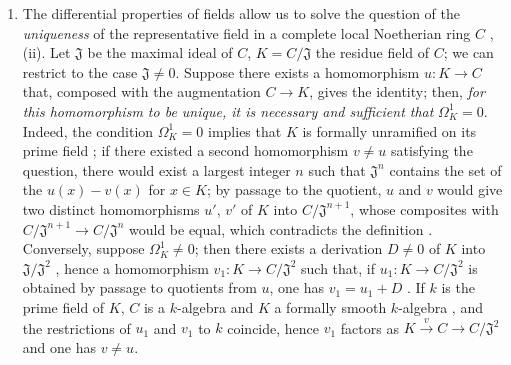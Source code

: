 \begin{remarks}[21.5.3]
\label{0.21.5.3}
\begin{enumerate}
  \item[(i)] The differential properties of fields allow us to solve the question of the \emph{uniqueness} of the representative field in a complete local Noetherian ring $C$ , (ii).
    Let $\mathfrak{J}$ be the maximal ideal of $C$, $K=C/\mathfrak{J}$ the residue field of $C$; we can restrict to the case $\mathfrak{J}\neq 0$.
    Suppose there exists a homomorphism $u:K\to C$ that, composed with the augmentation $C\to K$, gives the identity; then, \emph{for this homomorphism to be unique, it is necessary and sufficient that} $\Omega^1_K=0$.
    Indeed, the condition $\Omega^1_K=0$ implies that $K$ is formally unramified on its prime field ; if there existed a second homomorphism $v\neq u$ satisfying the question, there would exist a largest integer $n$ such that $\mathfrak{J}^n$ contains the set of the $u(x)-v(x)$ for $x\in K$; by passage to the quotient, $u$ and $v$ would give two distinct homomorphisms $u'$, $v'$ of $K$ into $C/\mathfrak{J}^{n+1}$, whose composites with $C/\mathfrak{J}^{n+1}\to C/\mathfrak{J}^n$ would be equal, which contradicts the definition .
    Conversely, suppose $\Omega^1_K\neq 0$; then there exists a derivation $D\neq 0$ of $K$ into $\mathfrak{J}/\mathfrak{J}^2$ , hence a homomorphism $v_1:K\to C/\mathfrak{J}^2$ such that, if $u_1:K\to C/\mathfrak{J}^2$ is obtained by passage to quotients from $u$, one has $v_1=u_1+D$ .
    If $k$ is the prime field of $K$, $C$ is a $k$-algebra and $K$ a formally smooth $k$-algebra , and the restrictions of $u_1$ and $v_1$ to $k$ coincide, hence $v_1$ factors as $K\xrightarrow{v} C\to C/\mathfrak{J}^2$ and one has $v\neq u$.


\end{enumerate}
\end{remarks}
